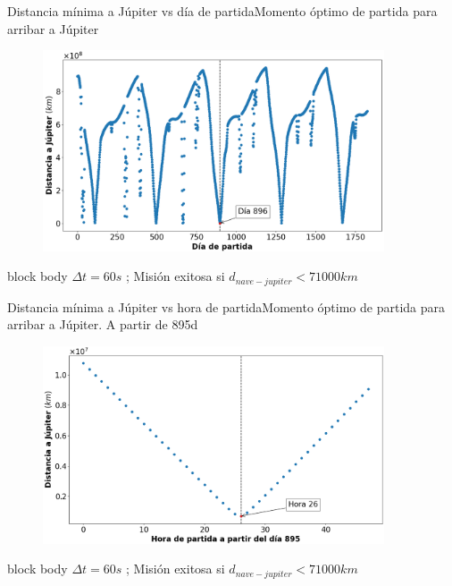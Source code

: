 \documentclass{beamer}
\begin{document}
            \begin{frame}{Distancia mínima a Júpiter vs día de partida}{Momento óptimo de partida para arribar a Júpiter}
                \begin{figure}[H!]
                    \includegraphics[width=0.9\textwidth]{./distancia_a_jupiter_vs_dia_de_partida}
                    \label{fig:jupiter_3}
                \end{figure}
                \begin{beamercolorbox}[sep=5pt,center]{block body}
                    \centering
                    \small{$\Delta t = 60s$ ; Misión exitosa si $d_{nave-jupiter} < 71000 km$}
                \end{beamercolorbox}
            \end{frame}

            \begin{frame}{Distancia mínima a Júpiter vs hora de partida}{Momento óptimo de partida para arribar a Júpiter. A partir de 895d}
                \begin{figure}[H!]
                    \includegraphics[width=0.9\textwidth]{./distancia_a_jupiter_vs_hora_de_partida}
                    \label{fig:jupiter_4}
                \end{figure}
                \begin{beamercolorbox}[sep=5pt,center]{block body}
                    \centering
                    \small{$\Delta t = 60s$ ; Misión exitosa si $d_{nave-jupiter} < 71000 km$}
                \end{beamercolorbox}
            \end{frame}
\end{document}
